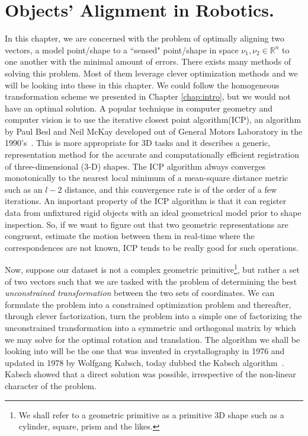 \chapter{Objects' Alignment in Robotics.}  
 \label{chap:opt_rot}
 
 In this chapter, we are concerned with the problem of optimally aligning two vectors, a model point/shape to a ``sensed" point/shape in space \eg $\nu_1, \nu_2 \in \mathbb{R}^n$ to one another with the minimal amount of errors. There exists many methods of solving this problem. Most of them leverage clever optimization methods and we will be looking into these in this chapter. We could follow the homogeneous transformation scheme we presented in Chapter \ref{chap:intro}, but we would not have an optimal solution. A popular technique in computer geometry and computer vision is to use the iterative closest point algorithm(ICP), an algorithm by Paul Besl and Neil McKay developed out of General Motors Laboratory in the 1990's~\cite{besl1992method}. This is more appropriate for 3D tasks and it describes a generic, representation method for the accurate and computationally efficient registration of three-dimensional (3-D) shapes. The ICP algorithm always converges monotonically to the nearest local minimum of a mean-square distance metric such as an $l-2$ distance, and this convergence rate is of the order of a few iterations. An important property of the ICP algorithm is that it can register data from unfixtured rigid objects with an ideal geometrical model prior to shape inspection. So, if we want to figure out that two geometric representations are congruent, estimate the motion between them in real-time where the correspondences are not known, ICP tends to be really good for such operations.
 
 Now, suppose our dataset is not a complex geometric primitive\footnote{We shall refer to a geometric primitive as a primitive 3D shape such as a cylinder, square, prism and the likes.}, but rather a set of two vectors such that we are tasked with the problem of determining the best \textit{unconstrained transformation} between the two sets of coordinates. We can formulate the problem into a constrained optimization problem and thereafter, through clever factorization, turn the problem into a simple one of factorizing the unconstrained transformation  into a symmetric and orthogonal matrix by which we may solve for the optimal rotation and translation. The algorithm we shall be looking into will be the one that was invented in crystallography in 1976 and updated in 1978 by Wolfgang Kabsch, today dubbed the Kabsch algorithm~\cite{Kabsch1978}. Kabsch showed that a direct solution was possible, irrespective of the non-linear character of the problem.
 
